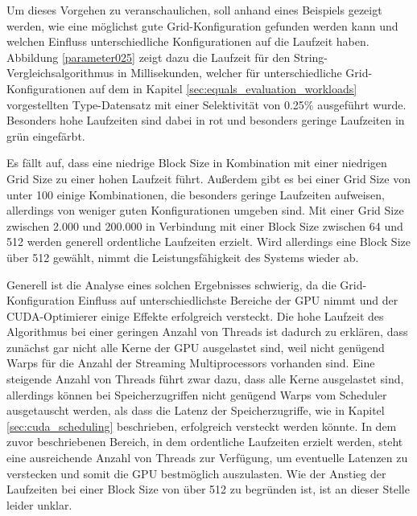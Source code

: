 Um dieses Vorgehen zu veranschaulichen, soll anhand eines Beispiels gezeigt werden, wie eine möglichst gute Grid-Konfiguration gefunden werden kann und welchen Einfluss unterschiedliche Konfigurationen auf die Laufzeit haben.
Abbildung \ref{parameter025} zeigt dazu die Laufzeit für den String-Vergleichsalgorithmus in Millisekunden, welcher für unterschiedliche Grid-Konfigurationen auf dem in Kapitel \ref{sec:equals_evaluation_workloads} vorgestellten Type-Datensatz mit einer Selektivität von 0.25\% ausgeführt wurde.
Besonders hohe Laufzeiten sind dabei in rot und besonders geringe Laufzeiten in grün eingefärbt.

Es fällt auf, dass eine niedrige Block Size in Kombination mit einer niedrigen Grid Size zu einer hohen Laufzeit führt.
Außerdem gibt es bei einer Grid Size von unter 100 einige Kombinationen, die besonders geringe Laufzeiten aufweisen, allerdings von weniger guten Konfigurationen umgeben sind.
Mit einer Grid Size zwischen 2.000 und 200.000 in Verbindung mit einer Block Size zwischen 64 und 512 werden generell ordentliche Laufzeiten erzielt.
Wird allerdings eine Block Size über 512 gewählt, nimmt die Leistungsfähigkeit des Systems wieder ab.

Generell ist die Analyse eines solchen Ergebnisses schwierig, da die Grid-Konfiguration Einfluss auf unterschiedlichste Bereiche der GPU nimmt und der CUDA-Optimierer einige Effekte erfolgreich versteckt.
Die hohe Laufzeit des Algorithmus bei einer geringen Anzahl von Threads ist dadurch zu erklären, dass zunächst gar nicht alle Kerne der GPU ausgelastet sind, weil nicht genügend Warps für die Anzahl der Streaming Multiprocessors vorhanden sind.
Eine steigende Anzahl von Threads führt zwar dazu, dass alle Kerne ausgelastet sind, allerdings können bei Speicherzugriffen nicht genügend Warps vom Scheduler ausgetauscht werden, als dass die Latenz der Speicherzugriffe, wie in Kapitel \ref{sec:cuda_scheduling} beschrieben, erfolgreich versteckt werden könnte.
In dem zuvor beschriebenen Bereich, in dem ordentliche Laufzeiten erzielt werden, steht eine ausreichende Anzahl von Threads zur Verfügung, um eventuelle Latenzen zu verstecken und somit die GPU bestmöglich auszulasten.
Wie der Anstieg der Laufzeiten bei einer Block Size von über 512 zu begründen ist, ist an dieser Stelle leider unklar.

